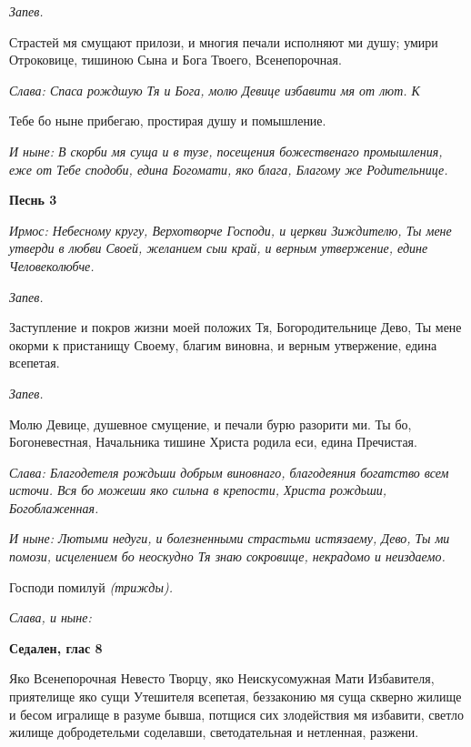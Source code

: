  \itshape Запев.\normalfont{}


   Страстей мя смущают прилози, и многия печали исполняют ми душу;
умири Отроковице, тишиною Сына и Бога Твоего, Всенепорочная.


 \itshape Слава:\normalfont{} Спаса рождшую Тя и Бога, молю Девице избавити мя от лют. К

Тебе бо ныне прибегаю, простирая душу и помышление.


 \itshape И ныне:\normalfont{} В скорби мя суща и в тузе, посещения божественаго
промышления, еже от Тебе сподоби, едина Богомати, яко блага, Благому же
Родительнице.






 

\bfseries Песнь 3\normalfont{}


 \itshape Ирмос:\normalfont{} Небесному кругу, Верхотворче Господи, и церкви Зиждителю, Ты
мене утверди в любви Своей, желанием сыи край, и верным утвержение,
едине Человеколюбче.


 \itshape Запев.\normalfont{}


   Заступление и покров жизни моей положих Тя, Богородительнице Дево,
Ты мене окорми к пристанищу Своему, благим виновна, и верным
утвержение, едина всепетая.


 \itshape Запев.\normalfont{}


   Молю Девице, душевное смущение, и печали бурю разорити ми. Ты
бо, Богоневестная, Начальника тишине Христа родила еси, едина
Пречистая.


 \itshape Слава:\normalfont{} Благодетеля рождьши добрым виновнаго, благодеяния богатство
всем источи. Вся бо можеши яко сильна в крепости, Христа рождьши,
Богоблаженная.


 \itshape И ныне:\normalfont{} Лютыми недуги, и болезненными страстьми истязаему, Дево, Ты
ми помози, исцелением бо неоскудно Тя знаю сокровище, некрадомо и
неиздаемо.


   Господи помилуй \itshape (трижды)\normalfont{}.


 \itshape Слава, и ныне\normalfont{}:






 

\bfseries Седален, глас 8\normalfont{}


   Яко Всенепорочная Невесто Творцу, яко Неискусомужная Мати
Избавителя, приятелище яко сущи Утешителя всепетая, беззаконию мя суща
скверно жилище и бесом игралище в разуме бывша, потщися сих
злодействия мя избавити, светло жилище добродетельми соделавши,
светодательная и нетленная, разжени.







